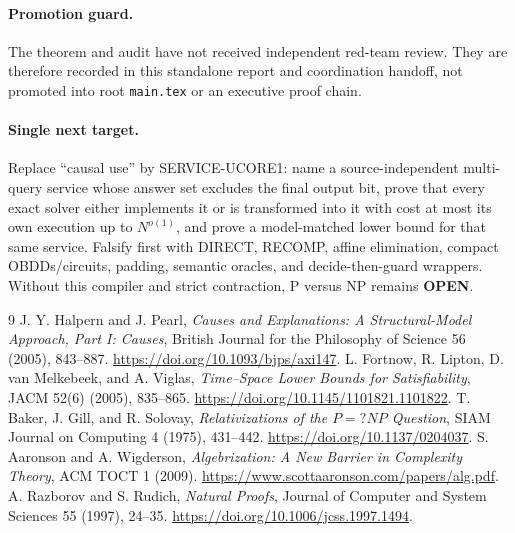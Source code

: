 \documentclass[11pt]{article}
\begin{document}
\paragraph{Promotion guard.}
The theorem and audit have not received independent red-team review.  They
are therefore recorded in this standalone report and coordination handoff,
not promoted into root \texttt{main.tex} or an executive proof chain.

\paragraph{Single next target.}
Replace ``causal use'' by \textsf{SERVICE-UCORE1}: name a source-independent
multi-query service whose answer set excludes the final output bit, prove
that every exact solver either implements it or is transformed into it with
cost at most its own execution up to $N^{o(1)}$, and prove a model-matched
lower bound for that same service.  Falsify first with DIRECT, RECOMP,
affine elimination, compact OBDDs/circuits, padding, semantic oracles, and
decide-then-guard wrappers.  Without this compiler and strict contraction, P
versus NP remains \textbf{OPEN}.

\begin{thebibliography}{9}
 J. Y. Halpern and J. Pearl,
\emph{Causes and Explanations: A Structural-Model Approach, Part I: Causes},
British Journal for the Philosophy of Science 56 (2005), 843--887.
\url{https://doi.org/10.1093/bjps/axi147}.
 L. Fortnow, R. Lipton, D. van Melkebeek, and A. Viglas,
\emph{Time--Space Lower Bounds for Satisfiability}, JACM 52(6) (2005),
835--865. \url{https://doi.org/10.1145/1101821.1101822}.
 T. Baker, J. Gill, and R. Solovay,
\emph{Relativizations of the $P=?NP$ Question}, SIAM Journal on Computing 4
(1975), 431--442. \url{https://doi.org/10.1137/0204037}.
 S. Aaronson and A. Wigderson,
\emph{Algebrization: A New Barrier in Complexity Theory}, ACM TOCT 1 (2009).
\url{https://www.scottaaronson.com/papers/alg.pdf}.
 A. Razborov and S. Rudich,
\emph{Natural Proofs}, Journal of Computer and System Sciences 55 (1997),
24--35. \url{https://doi.org/10.1006/jcss.1997.1494}.
\end{thebibliography}

\end{document}
